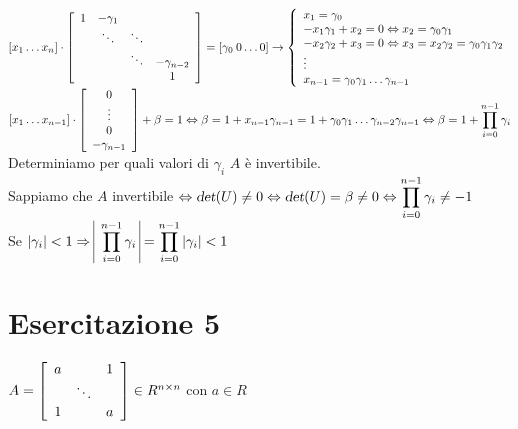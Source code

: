 \documentclass[10pt]{book}
\begin{document}
\begin{math}
\left[x_1 \ldots x_n\right]\cdot\left[ \begin{array}{c c c c}
	1 & -\gamma_1 & & \\
	& \ddots & \ddots &  \\
	& & \ddots & -\gamma_{n-2} \\
	& & & 1
\end{array} \right]
= \left[ \gamma_0\: 0 \ldots 0 \right] \rightarrow \left\{
\begin{array}{ll}
x_1 = \gamma_0\\
-x_1\gamma_1 + x_2 = 0 \Leftrightarrow x_2 = \gamma_0\gamma_1\\
-x_2\gamma_2 + x_3 = 0 \Leftrightarrow x_3 = x_2\gamma_2 = \gamma_0\gamma_1\gamma_2\\
\vdots\\
x_{n-1} = \gamma_0\gamma_1\ldots\gamma_{n-1}
\end{array}
\right.
\end{math}\\
\begin{math}
\left[ x_1\ldots x_{n-1} \right]\cdot\left[\begin{array}{c}
 0\\\vdots\\0\\-\gamma_{n-1}
\end{array} \right] + \beta = 1 \Leftrightarrow \beta = 1 + x_{n-1}\gamma_{n-1} = 1 + \gamma_0\gamma_1\ldots\gamma_{n-2}\gamma_{n-1} \Leftrightarrow \mathlarger{ \beta = 1 + \prod_{i=0}^{n-1} \gamma_i}
\end{math}\\
Determiniamo per quali valori di $\gamma_i$ $A$ è invertibile.\\
Sappiamo che $A$ invertibile $\Leftrightarrow \textsl{det}(U) \neq 0 \Leftrightarrow\textsl{det}(U) = \beta \neq 0 \Leftrightarrow \mathlarger{\prod_{i=0}^{n-1} \gamma_i} \neq -1$\\
Se $|\gamma_i| < 1 \Rightarrow\:\vline\:\mathlarger{\prod_{i=0}^{n-1} \gamma_i}\:\vline = \mathlarger{\prod_{i=0}^{n-1} |\gamma_i|} < 1$
\section{Esercitazione 5}
\begin{math}
A = \left[ \begin{array}{c c c}
	a & & 1\\
	& \ddots & \\
	1 & & a
\end{array} \right] \in R^{n \times n}
\end{math}
con $a \in R$
\end{document}

